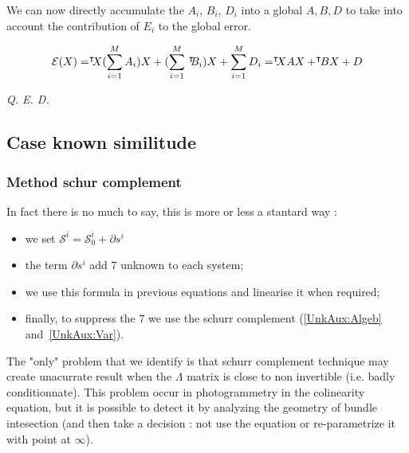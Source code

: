 We can now directly accumulate the $A_i$, $B_i$, $D_i$ into a global $A,B,D$ 
to take into account the contribution of $E_i$ to the global error.

\begin{equation}
    \mathcal{E}(X) =      \Transss {X}    (\sum\limits_{\substack{i=1 }}^{M} A_i) X  
                     +   (\sum\limits_{\substack{i=1 }}^{M} \, \Transs {B_i})   X   
                     +  \sum\limits_{\substack{i=1 }}^{M}  D_i
                   = \Transss {X} A X  +  \Transs {B}   X + D
\end{equation}

\begin{center}
    \emph {Q. E. D.}
\end{center}


\subsection{Case known similitude}


\subsubsection{Method schur complement}
In fact there is no much to say, this is more or less a stantard way :

\begin{itemize}
   \item we set $\mathcal{S}^i = \mathcal{S}^i_0 + \partial s^i $
   \item the term $\partial s^i $ add $7$ unknown to each system;
   \item we use this formula in previous equations and linearise it when required;
   \item finally, to suppress the $7$ we use the schurr complement (\ref{UnkAux:Algeb} and~\ref{UnkAux:Var}).
\end{itemize}

The "only" problem that we identify is that schurr complement technique may 
create unacurrate result when the $\Lambda$ matrix is close to non invertible 
(i.e. badly conditionnate).  This problem occur in photogrammetry in the
colinearity equation, but it is possible to detect it by analyzing the geometry
of bundle intesection (and then take a decision : not use the equation or 
re-parametrize it with point at $\infty$).


